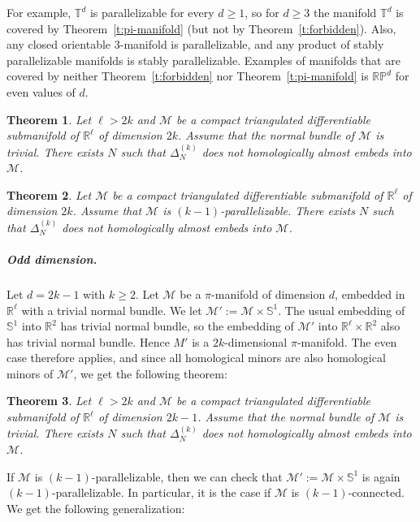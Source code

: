 \documentclass[a4paper,UKenglish,thm-restate]{article}
\newcommand{\R}{\mathbb{R}}
\newcommand{\s}{\mathbb{S}}
\newcommand{\M}{\mathcal{M}}
\newtheorem{theorem}{Theorem}
\begin{document}
\noindent
For example, $\mathbb{T}^d$ is parallelizable for every $d \ge 1$, so for $d \ge 3$ the manifold $\mathbb{T}^d$ is covered by Theorem~\ref{t:pi-manifold} (but not by Theorem~\ref{t:forbidden}). Also, any closed orientable $3$-manifold is parallelizable, and any product of stably parallelizable manifolds is stably parallelizable. Examples of manifolds that are covered by neither Theorem~\ref{t:forbidden} nor Theorem~\ref{t:pi-manifold} is $\mathbb{RP}^d$ for even values of $d$.


\iffalse

\begin{theorem}
Let $\ell>2k$ and $\M$ be a compact triangulated differentiable submanifold of $\R^\ell$ of dimension $2k$. Assume that the normal bundle of $\M$ is trivial. There exists $N$ such that $\Delta_N^{(k)}$ does not homologically almost embeds into $\M$.
\end{theorem}

\begin{theorem}
Let $\M$ be a compact triangulated differentiable submanifold of $\R^\ell$ of dimension $2k$. Assume that $\M$ is $(k-1)$-parallelizable. There exists $N$ such that $\Delta_N^{(k)}$ does not homologically almost embeds into $\M$.
\end{theorem}


\subparagraph{Odd dimension.}

Let $d = 2k-1$ with $k \ge 2$. Let $\M$ be a $\pi$-manifold of dimension $d$, embedded in $\R^\ell$ with a trivial normal bundle. We let $\M':=\M\times\s^1$. The usual embedding of $\s^1$ into $\R^2$ has trivial normal bundle, so the embedding of $\M'$ into $\R^{\ell}\times\R^2$ also has trivial normal bundle. Hence $M'$ is a $2k$-dimensional $\pi$-manifold. The even case therefore applies, and since all homological minors are also homological minors of $\M'$, we get the following theorem:

\begin{theorem}\label{t:odd-case}
Let $\ell>2k$ and $\M$ be a compact triangulated differentiable submanifold of $\R^\ell$ of dimension $2k-1$. Assume that the normal bundle of $\M$ is trivial. There exists $N$ such that $\Delta_N^{(k)}$ does not homologically almost embeds into $\M$.
\end{theorem}

If $\M$ is $(k-1)$-parallelizable, then we can check that $\M':=\M\times\s^1$ is again $(k-1)$-parallelizable. In particular, it is the case if $\M$ is $(k-1)$-connected. We get the following generalization:
\end{document}

